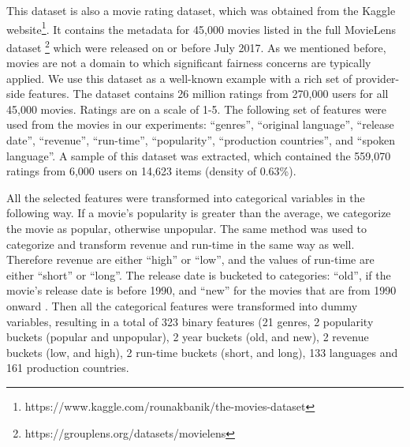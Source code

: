     This dataset is also a movie rating dataset, which was obtained from the Kaggle website\footnote{https://www.kaggle.com/rounakbanik/the-movies-dataset}. It contains the metadata for 45,000 movies listed in the full MovieLens dataset \footnote{https://grouplens.org/datasets/movielens} which were released on or before July 2017. As we mentioned before, movies are not a domain to which significant fairness concerns are typically applied. We use this dataset as a well-known example with a rich set of provider-side features. The dataset contains 26 million ratings from 270,000 users for all 45,000 movies. Ratings are on a scale of 1-5. The following set of features were used from the movies in our experiments: ``genres'', ``original language'', ``release date'', ``revenue'', ``run-time'', ``popularity'', ``production countries'', and ``spoken language''. A sample of this dataset was extracted, which contained the 559,070 ratings from 6,000 users on 14,623 items (density of 0.63\%). 
    
    All the selected features were transformed into categorical variables in the following way. If a movie's popularity is greater than the average, we categorize the movie as popular, otherwise unpopular. The same method was used to categorize and transform revenue and run-time in the same way as well. Therefore revenue are either ``high'' or ``low'', and the values of run-time are either ``short'' or ``long''. The release date is bucketed to categories: ``old'', if the movie's release date is before 1990, and ``new'' for the movies that are from 1990 onward \cite{kamishima2016model}. Then all the categorical features were transformed into dummy variables, resulting in a total of 323 binary features (21 genres, 2 popularity buckets (popular and unpopular), 2 year buckets (old, and new), 2 revenue buckets (low, and high), 2 run-time buckets (short, and long), 133 languages and 161 production countries.
    
    
    

